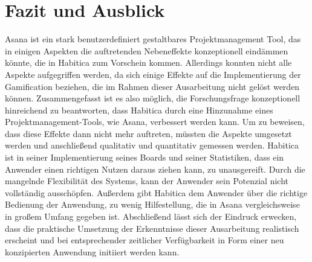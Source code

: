 \documentclass[sigconf, nonacm]{acmart}
\begin{document}
\section{Fazit und Ausblick}\label{sec:fazit}
Asana ist ein stark benutzerdefiniert gestaltbares Projektmanagement Tool, das in einigen Aspekten die auftretenden Nebeneffekte konzeptionell eindämmen könnte, die in Habitica zum Vorschein kommen. Allerdings konnten nicht alle Aspekte aufgegriffen werden, da sich einige Effekte auf die Implementierung der Gamification beziehen, die im Rahmen dieser Ausarbeitung nicht gelöst werden können. Zusammengefasst ist es also möglich, die Forschungsfrage konzeptionell hinreichend zu beantworten, dass Habitica durch eine Hinzunahme eines Projektmanagement-Tools, wie Asana, verbessert werden kann. Um zu beweisen, dass diese Effekte dann nicht mehr auftreten, müssten die Aspekte umgesetzt werden und anschließend qualitativ und quantitativ gemessen werden. Habitica ist in seiner Implementierung seines Boards und seiner Statistiken, dass ein Anwender einen richtigen Nutzen daraus ziehen kann, zu unausgereift. Durch die mangelnde Flexibilität des Systems, kann der Anwender sein Potenzial nicht vollständig ausschöpfen. Außerdem gibt Habitica dem Anwender über die richtige Bedienung der Anwendung, zu wenig Hilfestellung, die in Asana vergleichsweise in großem Umfang gegeben ist.
Abschließend lässt sich der Eindruck erwecken, dass die praktische Umsetzung der Erkenntnisse dieser Ausarbeitung realistisch erscheint und bei entsprechender zeitlicher Verfügbarkeit in Form einer neu konzipierten Anwendung initiiert werden kann.




\end{document}
